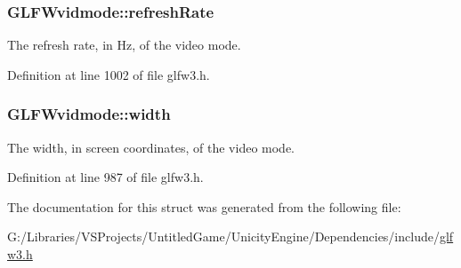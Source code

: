 \hypertarget{struct_g_l_f_wvidmode_a791bdd6c7697b09f7e9c97054bf05649}{}
\subsubsection[{refresh\+Rate}]{ G\+L\+F\+Wvidmode\+::refresh\+Rate}\label{struct_g_l_f_wvidmode_a791bdd6c7697b09f7e9c97054bf05649}
The refresh rate, in Hz, of the video mode. 

Definition at line 1002 of file glfw3.\+h.

\hypertarget{struct_g_l_f_wvidmode_a698dcb200562051a7249cb6ae154c71d}{}
\subsubsection[{width}]{ G\+L\+F\+Wvidmode\+::width}\label{struct_g_l_f_wvidmode_a698dcb200562051a7249cb6ae154c71d}
The width, in screen coordinates, of the video mode. 

Definition at line 987 of file glfw3.\+h.



The documentation for this struct was generated from the following file\+:\begin{DoxyCompactItemize}
\item 
G\+:/\+Libraries/\+V\+S\+Projects/\+Untitled\+Game/\+Unicity\+Engine/\+Dependencies/include/\hyperlink{glfw3_8h}{glfw3.\+h}\end{DoxyCompactItemize}
